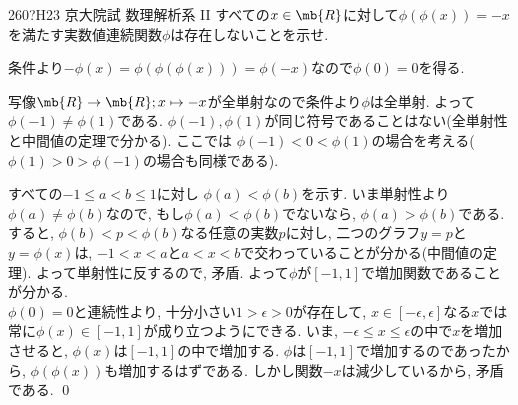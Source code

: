 \begin{prob}{260}{\hosi ?}{H23 京大院試 数理解析系 II}
すべての$x\in \mb{R}$に対して$\phi(\phi(x)) = -x$を満たす実数値連続関数$\phi$は存在しないことを示せ. 
\end{prob}

条件より$-\phi(x) = \phi(\phi(\phi(x))) = \phi(-x)$なので$\phi(0) = 0$を得る. \par 
写像$\mb{R}\to \mb{R}; x\mapsto -x$が全単射なので条件より$\phi$は全単射. よって$\phi(-1) \neq \phi(1)$である. $\phi(-1),\phi(1)$が同じ符号であることはない(全単射性と中間値の定理で分かる). ここでは $\phi(-1)<0<\phi(1)$の場合を考える($\phi(1)>0>\phi(-1)$の場合も同様である). \par
{}
すべての$-1\leq a<b\leq 1$に対し $\phi(a)<\phi(b)$を示す. いま単射性より$\phi(a)\neq \phi(b)$なので, もし$\phi(a) < \phi(b)$でないなら, $\phi(a) > \phi(b)$である. すると, $\phi(b) < p < \phi(b)$なる任意の実数$p$に対し, 二つのグラフ$y=p$と$y=\phi(x)$は, $-1< x<a$と$a<x<b$で交わっていることが分かる(中間値の定理). よって単射性に反するので, 矛盾. よって$\phi$が$[-1,1]$で増加関数であることが分かる. \\
$\phi(0) = 0$と連続性より, 十分小さい$1>\epsilon > 0$が存在して, $x\in [-\epsilon,\epsilon]$なる$x$では常に$\phi(x)\in [-1,1]$が成り立つようにできる. いま, $-\epsilon \leq x\leq \epsilon$の中で$x$を増加させると, $\phi(x)$は$[-1,1]$の中で増加する. $\phi$は$[-1,1]$で増加するのであったから, $\phi(\phi(x))$も増加するはずである. しかし関数$-x$は減少しているから, 矛盾である. \qed 